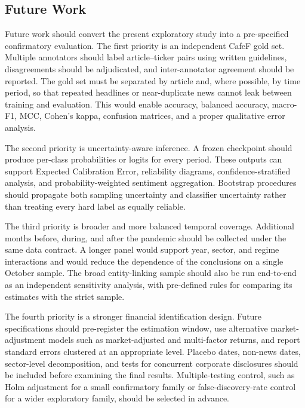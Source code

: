 \documentclass[12pt,a4paper]{article}
\begin{document}
\subsection{Future Work}
\label{subsec:future-work-statistical}

Future work should convert the present exploratory study into a pre-specified confirmatory evaluation. The first priority is an independent CafeF gold set. Multiple annotators should label article--ticker pairs using written guidelines, disagreements should be adjudicated, and inter-annotator agreement should be reported. The gold set must be separated by article and, where possible, by time period, so that repeated headlines or near-duplicate news cannot leak between training and evaluation. This would enable accuracy, balanced accuracy, macro-F1, MCC, Cohen's kappa, confusion matrices, and a proper qualitative error analysis.

The second priority is uncertainty-aware inference. A frozen checkpoint should produce per-class probabilities or logits for every period. These outputs can support Expected Calibration Error, reliability diagrams, confidence-stratified analysis, and probability-weighted sentiment aggregation. Bootstrap procedures should propagate both sampling uncertainty and classifier uncertainty rather than treating every hard label as equally reliable.

The third priority is broader and more balanced temporal coverage. Additional months before, during, and after the pandemic should be collected under the same data contract. A longer panel would support year, sector, and regime interactions and would reduce the dependence of the conclusions on a single October sample. The broad entity-linking sample should also be run end-to-end as an independent sensitivity analysis, with pre-defined rules for comparing its estimates with the strict sample.

The fourth priority is a stronger financial identification design. Future specifications should pre-register the estimation window, use alternative market-adjustment models such as market-adjusted and multi-factor returns, and report standard errors clustered at an appropriate level. Placebo dates, non-news dates, sector-level decomposition, and tests for concurrent corporate disclosures should be included before examining the final results. Multiple-testing control, such as Holm adjustment for a small confirmatory family or false-discovery-rate control for a wider exploratory family, should be selected in advance.
\end{document}
